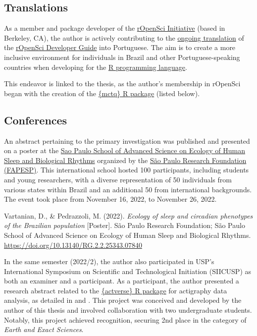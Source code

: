 \documentclass[
12pt,
openright,
oneside,
a4paper,
chapter=TITLE,
section=TITLE,
french,
spanish,
brazil,
english
]{abntex2}\usepackage{array}
\begin{document}
\subsection{Translations}\label{translations}

As a member and package developer of the
\href{https://ropensci.org/}{rOpenSci Initiative} (based in Berkeley,
CA), the author is actively contributing to the
\href{https://github.com/ropensci/dev_guide/pull/717}{ongoing
translation} of the \href{https://devguide.ropensci.org/}{rOpenSci
Developer Guide} into Portuguese. The aim is to create a more inclusive
environment for individuals in Brazil and other Portuguese-speaking
countries when developing for the \href{https://www.r-project.org/}{R
programming language}.

This endeavor is linked to the thesis, as the author's membership in
rOpenSci began with the creation of the
\href{https://docs.ropensci.org/mctq/}{\{mctq\} R package} (listed
below).

\subsection{Conferences}\label{conferences}

An abstract pertaining to the primary investigation was published and
presented on a poster at the
\href{https://espca.fapesp.br/school/sao_paulo_school_of_advanced_science_on_ecology_of_human_sleep_and_biological_rhythms/101/}{Sao
Paulo School of Advanced Science on Ecology of Human Sleep and
Biological Rhythms} organized by the \href{https://fapesp.br/en}{São
Paulo Research Foundation (FAPESP)}. This international school hosted
100 participants, including students and young researchers, with a
diverse representation of 50 individuals from various states within
Brazil and an additional 50 from international backgrounds. The event
took place from November 16, 2022, to November 26, 2022.

\smallskip

\noindent Vartanian, D., \& Pedrazzoli, M. (2022). \emph{Ecology of
sleep and circadian phenotypes of the Brazilian population}
{[}Poster{]}. São Paulo Research Foundation; São Paulo School of
Advanced Science on Ecology of Human Sleep and Biological Rhythms.
\url{https://doi.org/10.13140/RG.2.2.25343.07840}

\smallskip

In the same semester (2022/2), the author also participated in USP's
International Symposium on Scientific and Technological Initiation
(SIICUSP) as both an examiner and a participant. As a participant, the
author presented a research abstract related to the
\href{https://github.com/giperbio/actverse}{\{actverse\} R package} for
actigraphy data analysis, as detailed in \textcite{matias2022} and
\textcite{vartanian2022b}. This project was conceived and developed by
the author of this thesis and involved collaboration with two
undergraduate students. Notably, this project achieved recognition,
securing 2nd place in the category of \emph{Earth and Exact Sciences}.
\end{document}
